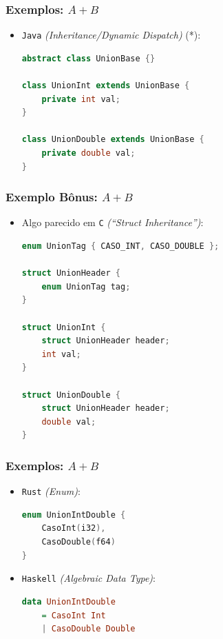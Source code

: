 \documentclass{beamer}
\newcommand{\lang}[1]{\texttt{#1}}
\begin{document}
\begin{frame}[fragile]
    \frametitle{Exemplos: \(A + B\)}
    \begin{itemize}
        \item \lang{Java} \emph{(Inheritance/Dynamic Dispatch)} (*):
            \begin{lstlisting}[language=Java]
abstract class UnionBase {}

class UnionInt extends UnionBase {
    private int val;
}

class UnionDouble extends UnionBase {
    private double val;
}
            \end{lstlisting}
    \end{itemize}
\end{frame}

\begin{frame}[fragile]
    \frametitle{Exemplo Bônus: \(A + B\)}
    \begin{itemize}
        \item Algo parecido em \lang{C}
            \emph{(``Struct Inheritance'')}:
            \begin{lstlisting}[language=C]
enum UnionTag { CASO_INT, CASO_DOUBLE };

struct UnionHeader {
    enum UnionTag tag;
}

struct UnionInt {
    struct UnionHeader header;
    int val;
}

struct UnionDouble {
    struct UnionHeader header;
    double val;
}
            \end{lstlisting}
    \end{itemize}
\end{frame}

\begin{frame}[fragile]
    \frametitle{Exemplos: \(A + B\)}
    \begin{itemize}
        \item \lang{Rust} \emph{(Enum)}:
            \begin{lstlisting}[language=C]
enum UnionIntDouble {
    CasoInt(i32),
    CasoDouble(f64)
}
            \end{lstlisting}
            \vfill
        \item \lang{Haskell} \emph{(Algebraic Data Type)}:
            \begin{lstlisting}[language=Haskell]
data UnionIntDouble
    = CasoInt Int
    | CasoDouble Double
            \end{lstlisting}
    \end{itemize}
\end{frame}
\end{document}
